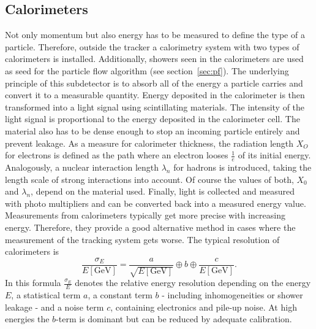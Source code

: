 \subsection{Calorimeters}
	Not only momentum but also energy has to be measured to define the type of a particle. Therefore, outside the tracker a calorimetry system with two types of calorimeters is installed. Additionally, showers seen in the calorimeters are used as seed for the particle flow algorithm (see section~\ref{sec:pf}). The underlying principle of this subdetector is to absorb all of the energy a particle carries and convert it to a measurable quantity. Energy deposited in the calorimeter is then transformed into a light signal using scintillating materials. The intensity of the light signal is proportional to the energy deposited in the calorimeter cell. The material also has to be dense enough to stop an incoming particle entirely and prevent leakage. As a measure for calorimeter thickness, the radiation length $X_O$ for electrons is defined as the path where an electron looses $\frac{1}{e}$ of its initial energy. Analogously, a nuclear interaction length $\lambda_n$ for hadrons is introduced, taking the length scale of strong interactions into account. Of course the values of both, $X_0$ and $\lambda_n$, depend on the material used. Finally, light is collected and measured with photo multipliers and can be converted back into a measured energy value. Measurements from calorimeters typically get more precise with increasing energy. Therefore, they provide a good alternative method in cases where the measurement of the tracking system gets worse. The typical resolution of calorimeters is
	\begin{equation}
	\frac{\sigma_E}{E\left[\text{GeV}\right]} = \frac{a}{\sqrt{E\left[\text{GeV}\right]}} \oplus b \oplus \frac{c}{E\left[\text{GeV}\right]}.
	\label{eq:calo}
	\end{equation}
	In this formula $\frac{\sigma_E}{E}$ denotes the relative energy resolution depending on the energy $E$, a statistical term $a$, a constant term $b$ - including inhomogeneities or shower leakage - and a noise term $c$, containing electronics and pile-up noise. At high energies the $b$-term is dominant but can be reduced by adequate calibration. 
